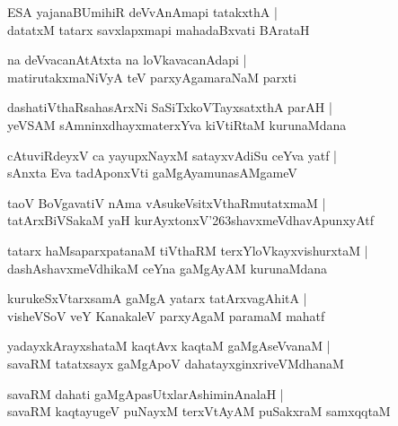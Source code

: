 \documentclass[twoside,12pt,openright]{book}
\def\S{\char'263}
\newcounter{shloka}[chapter]
\begin{document}
\begin{shloka}
ESA yajanaBUmihiR deVvAnAmapi tatakxthA |\\
datatxM tatarx savxlapxmapi mahadaBxvati BArataH 
\end{shloka}

\begin{shloka}
na deVvacanAtAtxta na loVkavacanAdapi |\\
matirutakxmaNiVyA teV parxyAgamaraNaM parxti 
\end{shloka}

\begin{shloka}
dashatiVthaRsahasArxNi SaSiTxkoVTayxsatxthA parAH |\\
yeVSAM sAmninxdhayxmaterxYva kiVtiRtaM kurunaMdana
\end{shloka}

\begin{shloka}
cAtuviRdeyxV ca yayupxNayxM satayxvAdiSu ceYva yatf |\\
sAnxta Eva tadAponxVti gaMgAyamunasAMgameV 
\end{shloka}

\begin{shloka}
taoV BoVgavatiV nAma vAsukeVsitxVthaRmutatxmaM |\\
tatArxBiVSakaM yaH kurAyxtonxV\S shavxmeVdhavApunxyAtf 
\end{shloka}

\begin{shloka}
tatarx haMsaparxpatanaM tiVthaRM terxYloVkayxvishurxtaM |\\
dashAshavxmeVdhikaM ceYna gaMgAyAM kurunaMdana 
\end{shloka}

\begin{shloka}
kurukeSxVtarxsamA gaMgA yatarx tatArxvagAhitA |\\
visheVSoV veY KanakaleV parxyAgaM paramaM mahatf 
\end{shloka}

\begin{shloka}
yadayxkArayxshataM kaqtAvx kaqtaM gaMgAseVvanaM |\\
savaRM tatatxsayx gaMgApoV dahatayxginxriveVMdhanaM 
\end{shloka}

\begin{shloka}
savaRM dahati gaMgApasUtxlarAshiminAnalaH |\\
savaRM kaqtayugeV puNayxM terxVtAyAM puSakxraM samxqqtaM 
\end{shloka}
\end{document}
